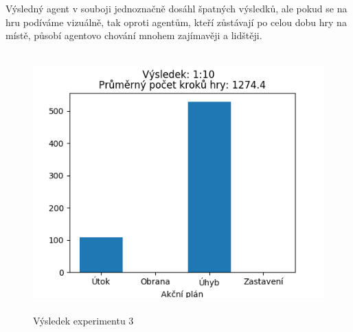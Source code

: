 \par
Výsledný agent v souboji jednoznačně dosáhl špatných výsledků, ale pokud se na hru podíváme vizuálně, tak oproti agentům, kteří zůstávají po celou dobu hry na místě, působí agentovo chování mnohem zajímavěji a lidštěji.


\begin{figure}[p]\centering
\includegraphics[width=125mm, height=100mm]{./Obrazky/Experiment03Results.png}
\caption{Výsledek experimentu 3}
\label{obr05:Výsledek experimentu 03}
\end{figure}








